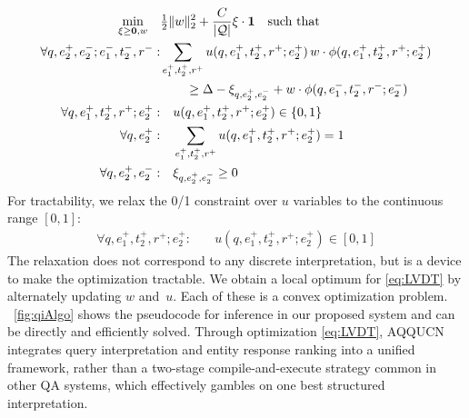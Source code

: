 \documentclass{svjour3}
\begin{document}
\begin{align}
\min_{\xi\ge\vec0, w} \quad
& \tfrac{1}{2}\|w\|_2^2 + \frac{C}{|\mathcal{Q}|} \xi \cdot \vec1 
\quad \text{such that} \notag \\
\forall q,e_2^+, e_2^-; e_1^-, t_2^-, r^-: &
  \sum_{e_1^+, t_2^+, r^+} u(q, e_1^+, t_2^+, r^+; e_2^+)\,
  w \cdot \phi(q, e_1^+, t_2^+, r^+; e_2^+)  \notag \\
  & \qquad \ge \Delta - \xi_{q,e_2^+, e_2^-} +
  w \cdot \phi(q, e_1^-, t_2^-, r^-; e_2^-) \label{eq:LVDT} \\
\forall q, e_1^+, t_2^+, r^+; e_2^+: 
& \quad u(q, e_1^+, t_2^+, r^+; e_2^+) \in \{0, 1\} \notag \\
\forall q,e_2^+: & \quad
\sum_{e_1^+, t_2^+, r^+} u(q, e_1^+, t_2^+, r^+; e_2^+) = 1 \notag \\
\forall q,e_2^+,e_2^-: & \quad \xi_{q,e_2^+, e_2^-} \geq 0 \notag
\end{align}
For tractability, we relax the 0/1 constraint over $u$ variables to
the continuous range $[0,1]$:
\begin{align}
\forall q, e_1^+, t_2^+, r^+; e_2^+: 
& \quad u(q, e_1^+, t_2^+, r^+; e_2^+) \in [0, 1]
\end{align}
The relaxation does not correspond to any discrete interpretation, but is a device to make the optimization tractable.  We obtain a local optimum for \eqref{eq:LVDT} by alternately updating $w$ and~$u$.  Each of these is a convex optimization problem.  \figurename~\ref{fig:qiAlgo} shows the pseudocode for inference in our proposed system and can be directly and efficiently solved.  Through optimization \eqref{eq:LVDT}, AQQUCN integrates query interpretation and entity response ranking into a unified framework, rather than a two-stage compile-and-execute strategy common in other QA systems, which effectively gambles on one best structured interpretation.  
\end{document}
